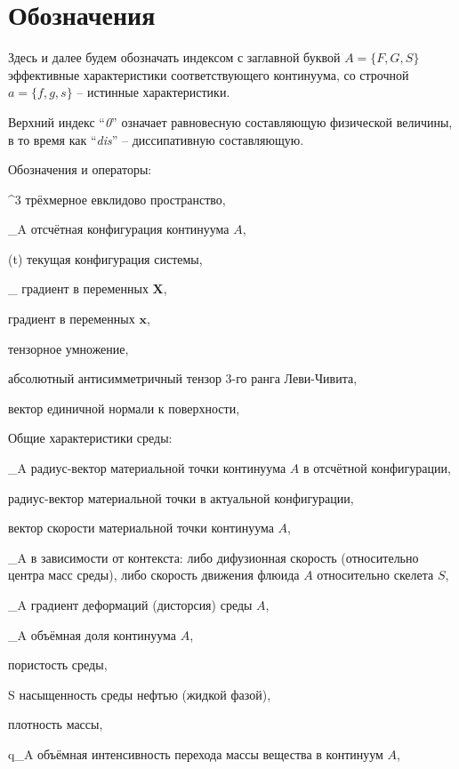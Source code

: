 \section*{Обозначения}
\setcounter{subsection}{0}

	Здесь и далее будем обозначать индексом с заглавной буквой $A = \{F, G, S\}$ эффективные характеристики соответствующего континуума, со строчной $a = \{f, g, s\}$ -- истинные характеристики.
	
	Верхний индекс ``\textit{0}'' означает равновесную составляющую физической величины, в то время как ``\textit{dis}'' -- диссипативную составляющую.

	Обозначения и операторы:
\begin{where}
	\item [\mathbb{E}^3] трёхмерное евклидово пространство,
	\item [\kappa_A] отсчётная конфигурация континуума $A$,
	\item [\chi(t)] текущая конфигурация системы,
	\item [\nabla_{\kappa}] градиент в переменных $\boldsymbol{X}$,
	\item [\nabla] градиент в переменных $\boldsymbol{x}$,
	\item [\otimes] тензорное умножение,
	\item [\boldsymbol{\varepsilon}] абсолютный антисимметричный тензор 3-го ранга Леви-Чивита,
	\item [\boldsymbol{n}] вектор единичной нормали к поверхности,
\end{where}

	Общие характеристики среды:
\begin{where}
	\item [\boldsymbol{X}_A] радиус-вектор материальной точки континуума $A$ в отсчётной конфигурации,
	\item [\boldsymbol{x}] радиус-вектор материальной точки в актуальной конфигурации,
	\item [\boldsymbol{v}] вектор скорости материальной точки континуума $A$,
	\item [\boldsymbol{w}_A] в зависимости от контекста: либо дифузионная скорость (относительно центра масс среды), либо скорость движения флюида $A$ относительно скелета $S$,
	\item [\boldsymbol{F}_A] градиент деформаций (дисторсия) среды $A$,
	\item [\phi_A] объёмная доля континуума $A$,
	\item [\phi] пористость среды,
	\item [S] насыщенность среды нефтью (жидкой фазой),
	\item [\rho] плотность массы,
	\item [q_A] объёмная интенсивность перехода массы вещества в континуум $A$,
\end{where}

